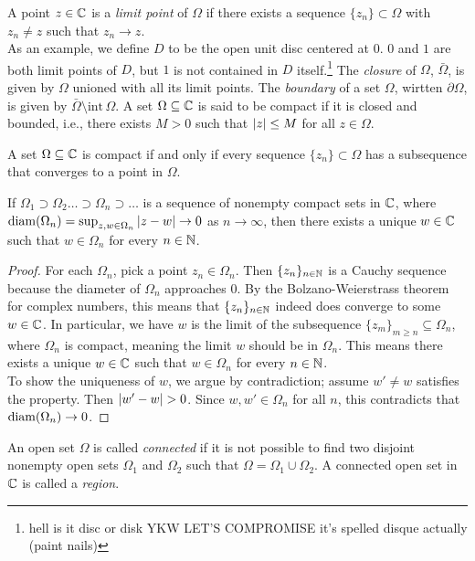 \noindent A point $z \in \mathbb C$ is a \textit{limit point} of $\Omega$ if there exists a sequence $\{z_n\} \subset \Omega$  with $z_n \neq z$ such that $z_n \to z$.
\\[8pt]
As an example, we define $D$ to be the open unit disc centered at $0$. $0$ and $1$ are both limit points of $D$, but $1$ is not contained in $D$ itself.\footnote{hell is it disc or disk YKW LET'S COMPROMISE it's spelled disque actually (paint nails)} The \textit{closure} of $\Omega$, $\bar{\Omega}$, is given by $\Omega$ unioned with all its limit points. The \textit{boundary} of a set $\Omega$, wirtten $\partial \Omega$, is given by $\bar{\Omega} \setminus \mathrm{int} \, \Omega$. A set $\Omega \subseteq \mathbb C$ is said to be compact if it is closed and bounded, i.e., there exists $M > 0$ such that $\left\lvert z \right\rvert \leq M$ for all $z \in \Omega$.
\begin{simplethm}
    A set $\Omega \subseteq \mathbb C$ is compact if and only if every sequence $\{z_n\} \subset \Omega$ has a subsequence that converges to a point in $\Omega$.
\end{simplethm}
\begin{simpleprop}
    If $\Omega_1 \supset \Omega_2 \dots \supset \Omega_n \supset \dots$ is a sequence of nonempty compact sets in $\mathbb C$, where $\operatorname{diam}(\Omega_n) = \sup_{z, w \in \Omega_n} \left\lvert z - w \right\rvert \to 0$ as $n \to \infty$, then there exists a unique $w \in \mathbb C$ such that $w \in \Omega_n$ for every $n \in \mathbb N$.
\end{simpleprop}
\begin{proof}
    For each $\Omega_n$, pick a point $z_n \in \Omega_n$. Then $\{z_n\}_{n \in \mathbb N}$ is a Cauchy sequence because the diameter of $\Omega_n$ approaches $0$. By the Bolzano-Weierstrass theorem for complex numbers, this means that $\{z_n\}_{n \in \mathbb N}$ indeed does converge to some $w \in \mathbb C$. In particular, we have $w$ is the limit of the subsequence $\{z_m\}_{m \geq n} \subseteq \Omega_n$, where $\Omega_n$ is compact, meaning the limit $w$ should be in $\Omega_n$. This means there exists a unique $w \in \mathbb C$ such that $w \in \Omega_n$ for every $n \in \mathbb N$.
    \\[8pt]
    To show the uniqueness of $w$, we argue by contradiction; assume $w' \neq w$ satisfies the property. Then $\left\lvert w' - w \right\rvert > 0$. Since $w, w' \in \Omega_n$ for all $n$, this contradicts that $\operatorname{diam}(\Omega_n) \to 0$.
\end{proof}
An open set $\Omega$ is called \textit{connected} if it is not possible to find two disjoint nonempty open sets $\Omega_1$ and $\Omega_2$ such that $\Omega = \Omega_1 \cup \Omega_2$. A connected open set in $\mathbb C$ is called a \textit{region}.